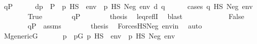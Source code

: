 \begin{isabellebody}
\ {\isachardoublequoteopen}q{\isasymin}P{\isachardoublequoteclose}\isanewline
\ \ \ \ \isamarkupfalse%
\ {\isachardoublequoteopen}{\isasymexists}d{\isasymin}{\isacharbraceleft}{\kern0pt}p\ {\isasymin}\ P\ {\isachardot}{\kern0pt}\ {\isacharparenleft}{\kern0pt}p\ {\isasymtturnstile}HS\ {\isasymphi}\ env{\isacharparenright}{\kern0pt}\ {\isasymor}\ {\isacharparenleft}{\kern0pt}p\ {\isasymtturnstile}HS\ Neg{\isacharparenleft}{\kern0pt}{\isasymphi}{\isacharparenright}{\kern0pt}\ env{\isacharparenright}{\kern0pt}{\isacharbraceright}{\kern0pt}{\isachardot}{\kern0pt}\ d{\isasympreceq}\ q{\isachardoublequoteclose}\isanewline
\ \ \ \ \isamarkupfalse%
\ {\isacharparenleft}{\kern0pt}cases\ {\isachardoublequoteopen}q\ {\isasymtturnstile}HS\ Neg{\isacharparenleft}{\kern0pt}{\isasymphi}{\isacharparenright}{\kern0pt}\ env{\isachardoublequoteclose}{\isacharparenright}{\kern0pt}\isanewline
\ \ \ \ \ \ \isamarkupfalse%
\ True\isanewline
\ \ \ \ \ \ \isamarkupfalse%
\ {\isacartoucheopen}q{\isasymin}P{\isacartoucheclose}\isanewline
\ \ \ \ \ \ \isamarkupfalse%
\ {\isacharquery}{\kern0pt}thesis\ \isamarkupfalse%
\ leq{\isacharunderscore}{\kern0pt}reflI\ \isamarkupfalse%
\ blast\isanewline
\ \ \ \ \isamarkupfalse%
\isanewline
\ \ \ \ \ \ \isamarkupfalse%
\ False\isanewline
\ \ \ \ \ \ \isamarkupfalse%
\ {\isacartoucheopen}q{\isasymin}P{\isacartoucheclose}\ \ assms\isanewline
\ \ \ \ \ \ \isamarkupfalse%
\ {\isacharquery}{\kern0pt}thesis\ \isamarkupfalse%
\ ForcesHS{\isacharunderscore}{\kern0pt}Neg\ envin\ \isamarkupfalse%
\ auto\isanewline
\ \ \ \ \isamarkupfalse%
\isanewline
\ \ \isamarkupfalse%
\isanewline
\ \ \isamarkupfalse%
\isanewline
\ \ \isamarkupfalse%
\ {\isacartoucheopen}M{\isacharunderscore}{\kern0pt}generic{\isacharparenleft}{\kern0pt}G{\isacharparenright}{\kern0pt}{\isacartoucheclose}\isanewline
\ \ \isamarkupfalse%
\isanewline
\ \ \isamarkupfalse%
\ p\ \ {\isachardoublequoteopen}p{\isasymin}G{\isachardoublequoteclose}\ {\isachardoublequoteopen}{\isacharparenleft}{\kern0pt}p\ {\isasymtturnstile}HS\ {\isasymphi}\ env{\isacharparenright}{\kern0pt}\ {\isasymor}\ {\isacharparenleft}{\kern0pt}p\ {\isasymtturnstile}HS\ Neg{\isacharparenleft}{\kern0pt}{\isasymphi}{\isacharparenright}{\kern0pt}\ env{\isacharparenright}{\kern0pt}{\isachardoublequoteclose}\isanewline

\end{isabellebody}
